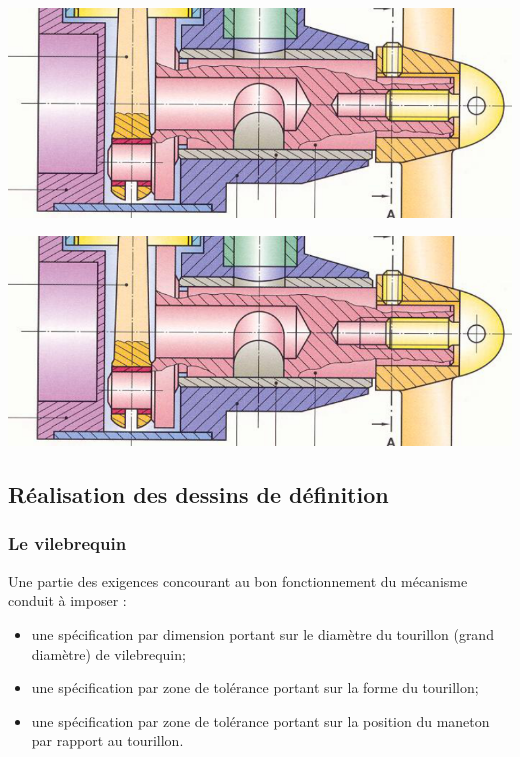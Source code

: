 \documentclass[11pt,oneside]{article}
\begin{document}
\vspace{1cm}

\begin{center}
\includegraphics[width=.8\textwidth]{png/vilebrequin}
\end{center}

\vspace{1cm}

\begin{center}
\includegraphics[width=.8\textwidth]{png/vilebrequin}
\end{center}


\newpage
\subsection{Réalisation des dessins de définition}
 
\subsubsection{Le vilebrequin}
Une partie des exigences concourant au bon fonctionnement du mécanisme conduit à imposer :
\begin{itemize}
\item une spécification par dimension portant sur le diamètre du tourillon (grand diamètre) de vilebrequin;
\item une spécification par zone de tolérance portant sur la forme du tourillon;
\item une spécification par zone de tolérance portant sur la position du maneton par rapport au tourillon.
\end{itemize}
\end{document}
